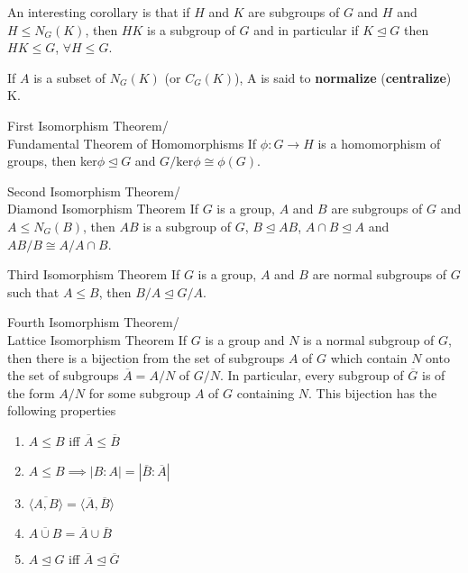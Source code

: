 \documentclass[titlepage, 12pt]{article}
\begin{document}
An interesting corollary is that if $H$ and $K$ are subgroups of $G$ and $H$ and
$H\le N_G(K)$, then $HK$ is a subgroup of $G$ and in particular if
$K\trianglelefteq G$ then $HK\le G$, $\forall H\le G$.
\begin{definition}{}{}
    If $A$ is a subset of $N_G(K)$ (or $C_G(K)$), A is said to
    \textbf{normalize} (\textbf{centralize}) K.
\end{definition}
\begin{theorem}{First Isomorphism Theorem/\\Fundamental Theorem of Homomorphisms}{}
    If $\phi:G\rightarrow H$ is a homomorphism of groups, then
    ker$\phi\trianglelefteq G$ and $G/\text{ker}\phi\cong \phi(G)$.
\end{theorem}
\begin{theorem}{Second Isomorphism Theorem/\\Diamond Isomorphism Theorem}{}
    If $G$ is a group, $A$ and $B$ are subgroups of $G$ and $A\le N_G(B)$, then
    $AB$ is a subgroup of $G$, $B\trianglelefteq AB$, $A\cap B\trianglelefteq A$
    and $AB/B\cong A/A\cap B$.
\end{theorem}
\begin{theorem}{Third Isomorphism Theorem}{}
    If $G$ is a group, $A$ and $B$ are normal subgroups of $G$ such that $A\le
    B$, then $B/A\trianglelefteq G/A$.
\end{theorem}
\begin{theorem}{Fourth Isomorphism Theorem/\\Lattice Isomorphism Theorem}{}
    If $G$ is a group and $N$ is a normal subgroup of $G$, then there is a
    bijection from the set of subgroups $A$ of $G$ which contain $N$ onto the
    set of subgroups $\overline A = A/N$ of $G/N$. In particular, every subgroup
    of $\overline G$ is of the form $A/N$ for some subgroup $A$ of $G$
    containing $N$. This bijection has the following properties
    \begin{enumerate}
        \item $A\le B$ iff $\overline A\le\overline B$
        \item $A\le B\implies |B:A| = |\overline B:\overline A|$
        \item $\overline{\langle A, B\rangle} = \langle\overline A, \overline
            B\rangle$
        \item $\overline{A\cup B} = \overline A\cup\overline B$
        \item $A\trianglelefteq G$ iff $\overline A\trianglelefteq\overline G$
    \end{enumerate}
\end{theorem}
\end{document}
